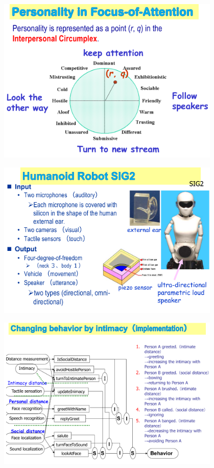 \documentclass[xetex,mathserif,serif]{beamer}
\begin{document}
	\begin{frame}
		\begin{center}
			\includegraphics[width=0.8\textwidth]{okuno17.png}
		\end{center}
	\end{frame}

	\begin{frame}
		\begin{center}
			\includegraphics[width=0.8\textwidth]{okuno18.png}
		\end{center}
	\end{frame}

	\begin{frame}
		\begin{center}
			\includegraphics[width=0.8\textwidth]{okuno19.png}
		\end{center}
	\end{frame}
\end{document}
